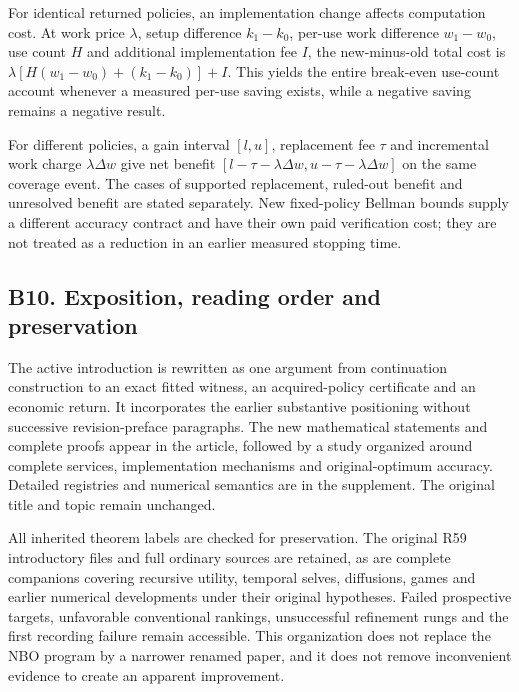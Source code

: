 \documentclass[ecta,nameyear,draft]{econsocart}
\begin{document}
For identical returned policies, an implementation change affects
computation cost. At work price \(\lambda\), setup difference
\(k_1-k_0\), per-use work difference \(w_1-w_0\), use count \(H\) and
additional implementation fee \(I\), the new-minus-old total cost is
\(\lambda[H(w_1-w_0)+(k_1-k_0)]+I\). This yields the entire break-even
use-count account whenever a measured per-use saving exists, while a
negative saving remains a negative result.

For different policies, a gain interval \([l,u]\), replacement fee
\(\tau\) and incremental work charge \(\lambda\Delta w\) give net
benefit \([l-\tau-\lambda\Delta w,u-\tau-\lambda\Delta w]\) on the same
coverage event. The cases of supported replacement, ruled-out benefit
and unresolved benefit are stated separately. New fixed-policy Bellman
bounds supply a different accuracy contract and have their own paid
verification cost; they are not treated as a reduction in an earlier
measured stopping time.

\hypertarget{b10.-exposition-reading-order-and-preservation}{%
\subsection{B10. Exposition, reading order and
preservation}\label{b10.-exposition-reading-order-and-preservation}}

The active introduction is rewritten as one argument from continuation
construction to an exact fitted witness, an acquired-policy certificate
and an economic return. It incorporates the earlier substantive
positioning without successive revision-preface paragraphs. The new
mathematical statements and complete proofs appear in the article,
followed by a study organized around complete services, implementation
mechanisms and original-optimum accuracy. Detailed registries and
numerical semantics are in the supplement. The original title and topic
remain unchanged.

All inherited theorem labels are checked for preservation. The original
R59 introductory files and full ordinary sources are retained, as are
complete companions covering recursive utility, temporal selves,
diffusions, games and earlier numerical developments under their
original hypotheses. Failed prospective targets, unfavorable
conventional rankings, unsuccessful refinement rungs and the first
recording failure remain accessible. This organization does not replace
the NBO program by a narrower renamed paper, and it does not remove
inconvenient evidence to create an apparent improvement.
\end{document}
